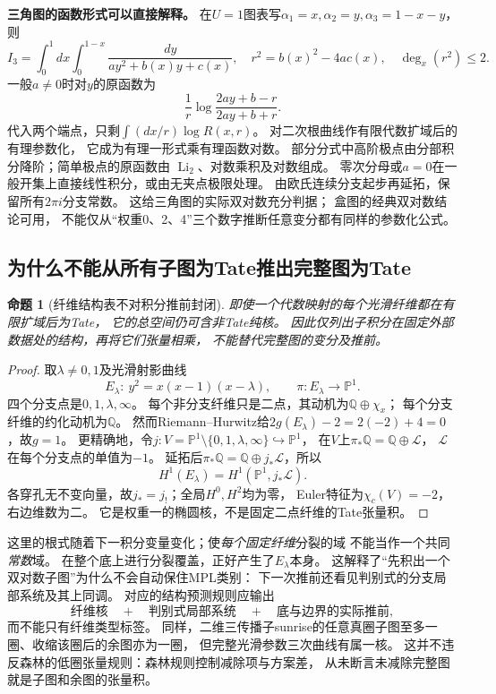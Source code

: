 \documentclass[11pt,a4paper]{ctexart}
\theoremstyle{cnplain}\newtheorem{theorem}{定理}[section]
\newtheorem{proposition}[theorem]{命题}
\theoremstyle{definition}\newtheorem{definition}[theorem]{定义}
\theoremstyle{remark}\newtheorem{remark}[theorem]{注}
\newcommand{\Q}{\mathbb Q}\newcommand{\cC}{\mathcal C}
\begin{document}
\textbf{三角图的函数形式可以直接解释。}
在$U=1$图表写$\alpha_1=x,\alpha_2=y,\alpha_3=1-x-y$，则
\[
 I_3=\int_0^1dx\int_0^{1-x}\frac{dy}{a y^2+b(x)y+c(x)},
 \quad r^2=b(x)^2-4ac(x),\quad\deg_x(r^2)\le2.
\]
一般$a\ne0$时对$y$的原函数为
\[
 \frac1r\log\frac{2ay+b-r}{2ay+b+r}.
\]
代入两个端点，只剩$\int(dx/r)\log R(x,r)$。
对二次根曲线作有限代数扩域后的有理参数化，
它成为有理一形式乘有理函数对数。
部分分式中高阶极点由分部积分降阶；简单极点的原函数由
$\operatorname{Li}_2$、对数乘积及对数组成。
零次分母或$a=0$在一般开集上直接线性积分，或由无夹点极限处理。
由欧氏连续分支起步再延拓，保留所有$2\pi i$分支常数。
这给三角图的实际双对数充分判据；
盒图的经典双对数结论可用\cite[\S8--9]{BKone}，
不能仅从“权重0、2、4”三个数字推断任意变分都有同样的参数化公式。

\subsection{为什么不能从所有子图为Tate推出完整图为Tate}
\begin{proposition}[纤维结构表不对积分推前封闭]\label{prop:fiberwarning}
即使一个代数映射的每个光滑纤维都在有限扩域后为Tate，
它的总空间仍可含非Tate纯核。
因此仅列出子积分在固定外部数据处的结构，再将它们张量相乘，
不能替代完整图的变分及推前。
\end{proposition}
\begin{proof}
取$\lambda\ne0,1$及光滑射影曲线
\[
 E_\lambda:\ y^2=x(x-1)(x-\lambda),\qquad
 \pi:E_\lambda\longrightarrow\mathbb P^1.
\]
四个分支点是$0,1,\lambda,\infty$。
每个非分支纤维只是二点，其动机为$\Q\oplus\chi_x$；
每个分支纤维的约化动机为$\Q$。
然而Riemann--Hurwitz给$2g(E_\lambda)-2=2(-2)+4=0$，故$g=1$。
更精确地，令$j:V=\mathbb P^1\setminus\{0,1,\lambda,\infty\}\hookrightarrow\mathbb P^1$，
在$V$上$\pi_*\Q=\Q\oplus\mathcal L$，
$\mathcal L$在每个分支点的单值为$-1$。
延拓后$\pi_*\Q=\Q\oplus j_*\mathcal L$，所以
\[
 H^1(E_\lambda)=H^1(\mathbb P^1,j_*\mathcal L).
\]
各穿孔无不变向量，故$j_*=j_!$；全局$H^0,H^2$均为零，
Euler特征为$\chi_c(V)=-2$，右边维数为二。
它是权重一的椭圆核，不是固定二点纤维的Tate张量积。
\end{proof}

这里的根式随着下一积分变量变化；使\emph{每个固定纤维}分裂的域
不能当作一个共同\emph{常数}域。
在整个底上进行分裂覆盖，正好产生了$E_\lambda$本身。
这解释了“先积出一个双对数子图”为什么不会自动保住MPL类别：
下一次推前还看见判别式的分支局部系统及其上同调。
对应的结构预测规则应输出
\[
 \text{纤维核}\quad+\quad\text{判别式局部系统}\quad+
       \quad\text{底与边界的实际推前},
\]
而不能只有纤维类型标签。
同样，二维三传播子sunrise的任意真圈子图至多一圈、收缩该圈后的余图亦为一圈，
但完整光滑参数三次曲线有属一核。
这并不违反森林的低圈张量规则：森林规则控制减除项与方案差，
从未断言未减除完整图就是子图和余图的张量积。
\end{document}
